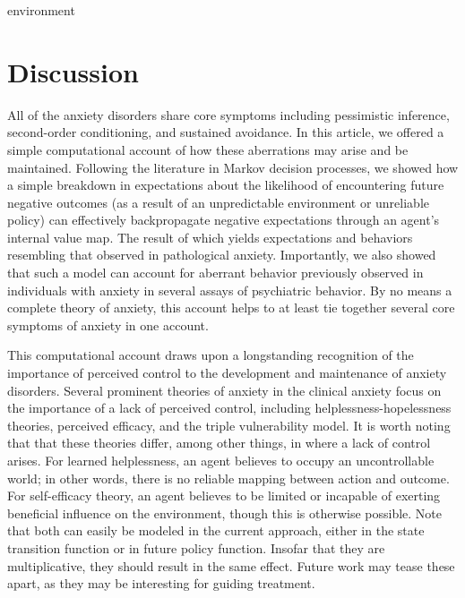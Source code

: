 environment\documentclass[11pt]{article} %
\begin{document}
\section{Discussion}

All of the anxiety disorders share core symptoms including pessimistic inference,
second-order conditioning, and sustained avoidance. In this article, we offered
a simple computational account of how these aberrations may arise and be maintained.
Following the literature in Markov decision processes, we showed how a simple
breakdown in expectations about the likelihood of encountering future negative
outcomes (as a result of an unpredictable environment or unreliable policy) can
effectively backpropagate negative expectations through an agent's internal value
map. The result of which yields expectations and behaviors resembling that observed
in pathological anxiety. Importantly, we also showed that such a model can account
for aberrant behavior previously observed in individuals with anxiety in several
assays of psychiatric behavior. By no means a complete theory of anxiety, this
account helps to at least tie together several core symptoms of anxiety in one
account.

This computational account draws upon a longstanding recognition of the importance
of perceived control to the development and maintenance of anxiety disorders. Several
prominent theories of anxiety in the clinical anxiety focus on the importance of
a lack of perceived control, including helplessness-hopelessness theories, perceived
efficacy, and the triple vulnerability model. It is worth noting that that these
theories differ, among other things, in where a lack of control arises. For learned
helplessness, an agent believes to occupy an uncontrollable world; in other words,
there is no reliable mapping between action and outcome. For self-efficacy theory,
an agent believes to be limited or incapable of exerting beneficial influence on
the environment, though this is otherwise possible. Note that both can easily be
modeled in the current approach, either in the state transition function or in
future policy function. Insofar that they are multiplicative, they should result
in the same effect. Future work may tease these apart, as they may be interesting
for guiding treatment.
\end{document}
